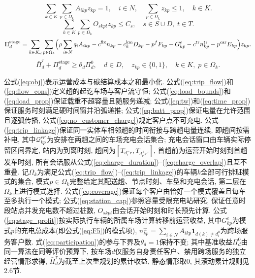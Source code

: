 \documentclass{setp-new}
\begin{document}
\begin{equation}
\sum_{k\in K}\sum_{p\in\Omega_k}A_{ikp}z_{kp}=1,\quad i\in N,\quad
\sum_{p\in\Omega_k}z_{kp}\le1,\quad k\in K.
\label{eq:coverage}
\end{equation}
\begin{equation}
\sum_{k\in K}\sum_{p\in\Omega_k}O_{skpt}z_{kp}\le C_s,\quad s\in S\cup D,\;t\in T.
\label{eq:station_cap}
\end{equation}
\begin{equation}
\Pi_d^{\mathrm{stage}}=\sum_{k\in K_d}\sum_{p\in\Omega_k}
\Bigl(\rho\sum_{i\in N}q_iA_{ikp}
-c^{\mathrm{fix}}n_{kp}-c_k^{\mathrm{km}}D_{kp}-p^fF_{kp}-G_{kp}^{e}
-c^{\mathrm{tr}}n_{kp}^{\mathrm{tr}}-p^{\mathrm{car}}E_{kp}\Bigr)z_{kp}.
\label{eq:stage_profit}
\end{equation}
\begin{equation}
\bar\Pi_d^\tau+\Pi_d^{\mathrm{stage}}\ge\theta_d\Pi_d^0,\quad d\in D,\quad
z_{kp}\in\{0,1\},\quad k\in K,\;p\in\Omega_k.
\label{eq:participation}
\end{equation}

公式(\ref{eq:obj})表示运营成本与碳结算成本之和最小化.
公式(\ref{eq:trip_flow})和(\ref{eq:flow_cons})定义趟的起讫车场与客户流守恒;
公式(\ref{eq:load_bounds})和(\ref{eq:load_prop})保证载重不超容量且随服务递减;
公式(\ref{eq:tw})和(\ref{eq:time_prop})保证服务时刻满足硬时间窗并沿弧递推;
公式(\ref{eq:batt_prop})保证电量在允许范围且逐弧传播, 公式(\ref{eq:no_customer_charge})规定客户点不可充电.
公式(\ref{eq:trip_linkage})保证同一实体车相邻趟的时间衔接与跨趟电量连续, 即趟间按需补电,
其中$\mathcal Q_{kp}^{rr'}$为安排在两趟之间的车场充电会话集合;
充电会话窗口由车辆实际停留区间界定, 站内为到离时刻, 趟间为$[T_{d_r^-r},T_{d_{r'}^+r'}]$,
首趟前为运营开始时刻到首趟发车时刻, 所有会话服从公式(\ref{eq:charge_duration})--(\ref{eq:charge_overlap})且互不重叠.
记$\Omega_k$为满足公式(\ref{eq:trip_flow})--(\ref{eq:trip_linkage})的车辆$k$全部可行排班模式的集合,
模式$p\in\Omega_k$完整给定其配送趟、节点时刻、车型和充电会话, 第二层在$\Omega_k$上进行模式选择.
公式(\ref{eq:coverage})保证每个客户由恰好一个模式覆盖且每车至多执行一个模式;
公式(\ref{eq:station_cap})参照容量受限充电站研究\cite{ref:12,ref:13},
保证任意时段站点并发充电数不超过桩数, $O_{skpt}$由会话开始时刻和时长预先计算.
公式(\ref{eq:stage_profit})按实际执行车辆的所属车场计算转移前运营收益,
其中$G_{kp}^{e}$为模式$p$的充电总成本(即公式(\ref{eq:F5})的模式项),
$n_{kp}^{\mathrm{tr}}=\sum_{i\in N}A_{ikp}\mathbf 1_{d(k)\neq d_i^0}$为跨场服务客户数.
式(\ref{eq:participation})的参与下界及$\theta_d=1$保持不变;
其中基准收益$\Pi_d^0$由同一算法在同等评价预算下,
按车场$d$仅服务自身责任客户、禁用跨场服务的独立经营情形求得,
$\bar\Pi_d^\tau$为截至上次重规划的累计收益, 静态情形取0, 其滚动累计规则见2.6节.
\end{document}
